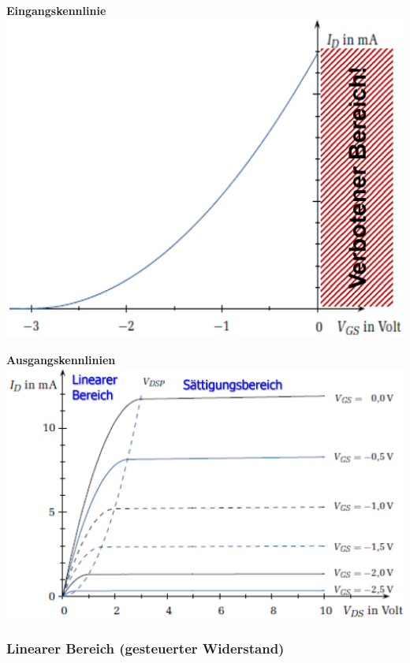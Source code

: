 \begin{minipage}[t]{0.43\columnwidth}
    \centering \textbf{Eingangskennlinie} \\
    \includegraphics[align=c, width=\columnwidth]{images/jfet_eingangskennlinie.png}
\end{minipage}
\hfill
\begin{minipage}[t]{0.54\columnwidth}
    \textbf{Ausgangskennlinien} \\
    \includegraphics[align=c, width=\columnwidth]{images/jfet_ausgangskennlinien.png}
\end{minipage}


\subsubsection{Linearer Bereich (gesteuerter Widerstand)}

